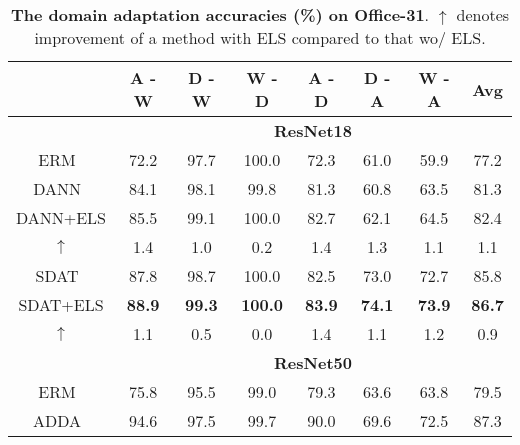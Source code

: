 \documentclass{article} \usepackage{iclr2023_conference,times}
\newcommand{\ls}[0]{ELS\xspace}
\newcommand{\Gray}[0]{\rowcolor{gray!20}}
\begin{document}
\begin{table}[]
\centering
\scriptsize
\caption{\textbf{The domain adaptation accuracies (\%) on Office-31}. $\uparrow$ denotes improvement of a method with \ls compared to that wo/ \ls.}\label{tab:offce31}
\begin{tabular}{@{}c|ccccccc@{}}
\toprule
            & \textbf{A - W} & \textbf{D - W} & \textbf{W - D} & \textbf{A - D} & \textbf{D - A} & \textbf{W - A} & \textbf{Avg} \\ \midrule
            & \multicolumn{7}{c}{{\color{brown}\textbf{ResNet18}}}                                                                                       \\
ERM~\citep{vapnik1998statistical}         & 72.2           & 97.7           & 100.0          & 72.3           & 61.0           & 59.9           & 77.2         \\
DANN~\citep{ganin2016domain}        & 84.1           & 98.1           & 99.8           & 81.3           & 60.8           & 63.5           & 81.3         \\\Gray
DANN+ELS    & 85.5           & 99.1           & 100.0          & 82.7           & 62.1           & 64.5           & 82.4         \\\Gray
$\uparrow$ & 1.4            & 1.0            & 0.2            & 1.4            & 1.3            & 1.1            & 1.1          \\
SDAT~\citep{rangwani2022closer}        & 87.8           & 98.7           & 100.0          & 82.5           & 73.0           & 72.7           & 85.8         \\\Gray
SDAT+ELS    & \textbf{88.9}           & \textbf{99.3}           & \textbf{100.0 }         & \textbf{83.9}           & \textbf{74.1}           & \textbf{73.9}           & \textbf{86.7}         \\\Gray
$\uparrow$ & 1.1            & 0.5            & 0.0            & 1.4            & 1.1            & 1.2            & 0.9          \\\hline\hline
            & \multicolumn{7}{c}{{{\color{brown}\textbf{ResNet50}}}}                                                                                       \\
ERM~\citep{vapnik1998statistical}         & 75.8           & 95.5           & 99.0           & 79.3           & 63.6           & 63.8           & 79.5         \\
ADDA~\citep{tzeng2017adversarial}        & 94.6           & 97.5           & 99.7           & 90.0           & 69.6           & 72.5           & 87.3         \\

\end{tabular}
\end{table}
\end{document}
